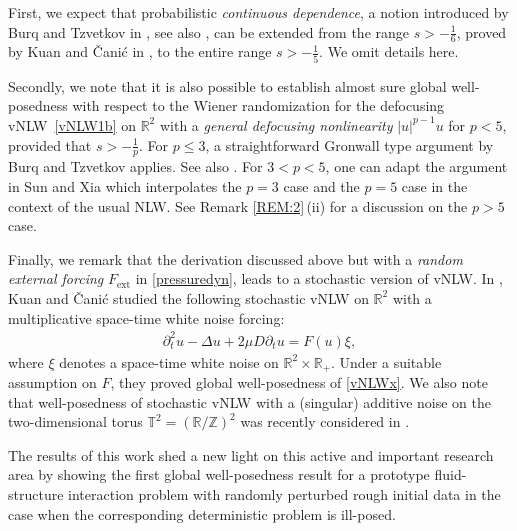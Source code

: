 \documentclass[letterpaper, 11pt,  reqno]{amsart}
\newcommand{\1}{\hspace{0.5mm}\text{I}\hspace{0.2mm}}
\newcommand{\Z}{\mathbb{Z}}
\newcommand{\R}{\mathbb{R}}
\newcommand{\T}{\mathbb{T}}
\newcommand{\Dl}{\Delta}
\newcommand{\dt}{\partial_t}
\numberwithin{equation}{section}
\numberwithin{theorem}{section}
\begin{document}
First, we expect that probabilistic {\emph{continuous dependence}},
a notion introduced by Burq and Tzvetkov in \cite{BT3}, see also \cite{Poc},
can be extended from the range $s > -\frac 16$, proved by Kuan and \v{C}ani\'c in \cite{KC},
to the entire range $s > -\frac 15$. We omit details here.


Secondly,  we note that it is also possible to establish almost sure global well-posedness
with respect to the Wiener randomization
for the defocusing vNLW~\eqref{vNLW1b} on $\R^2$
with a {\emph{general defocusing nonlinearity}} $|u|^{p-1} u$ for $p < 5$, 
provided that $s >  - \frac 1p$.
For $p \leq 3$, a straightforward Gronwall type argument
by Burq and Tzvetkov \cite{BT3} applies.
See also \cite{Poc}.
For $3 < p < 5$, one can adapt the argument in Sun and Xia \cite{SX}
which interpolates the $p = 3$ case \cite{BT3}
and the $p = 5$ case \cite{OP} 
in the context of the usual NLW.
See Remark \ref{REM:2}\,(ii)
for a discussion on the $p > 5$ case.


Finally, we remark that the derivation discussed above but with a {\emph{random external forcing}} 
$F_{\text{ext}}$ in \eqref{pressuredyn}, 
leads to a stochastic version of  vNLW.
In \cite{KC2}, Kuan and \v{C}ani\'c
studied the following stochastic vNLW  on $\R^2$ with a multiplicative space-time white noise forcing:
\begin{align}
\dt^2 u - \Dl  u  + 2\mu D \dt u   = F(u)  \xi , 
\label{vNLWx}
\end{align}
where $\xi$ denotes a space-time white noise on $\R^2\times \R_+$.
Under a suitable assumption on $F$, 
they proved global well-posedness of \eqref{vNLWx}.
We also note that well-posedness of stochastic vNLW with a (singular) additive noise
on the two-dimensional torus $\T^2= (\R/\Z)^2$ was recently considered in \cite{LO, Liu}.

The results of this work shed a new light on this active and important research area by showing
the first global well-posedness result for a prototype fluid-structure interaction problem with randomly perturbed rough initial data
in the case when the corresponding deterministic problem is ill-posed.
\end{document}
